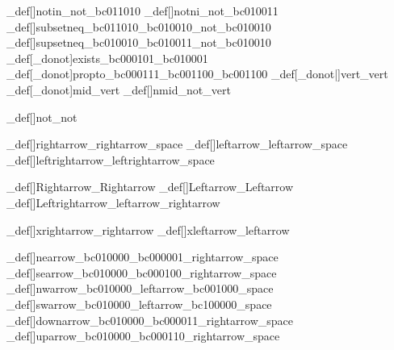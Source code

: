 \brl@char_def[\brl@char@not{}]{notin}{\brl@char@alias_not\brl@char_bc011010}
\brl@char_def[\brl@char@not{}]{notni}{\brl@char@alias_not\brl@char_bc010011}
\brl@char_def[]{subsetneq}{\brl@char_bc011010\brl@char_bc010010\brl@char@alias_not\brl@char_bc010010}
\brl@char_def[]{supsetneq}{\brl@char_bc010010\brl@char_bc010011\brl@char@alias_not\brl@char_bc010010}
\brl@char_def[\brl@char_donot]{exists}{\brl@char_bc000101\brl@char_bc010001}
\brl@char_def[\brl@char_donot]{propto}{\brl@char_bc000111\brl@char_bc001100\brl@char_bc001100}
\brl@char_def[\brl@char_donot|]{vert}{\brl@char@alias_vert}
\brl@char_def[\brl@char_donot]{mid}{\brl@char@alias_vert}
\brl@char_def[]{nmid}{\brl@char@alias_not\brl@char@alias_vert}






\brl@char_def[\gdef\brl@char_donot{\brl@char@donot}]{not}{\brl@char@alias_not}



\brl@char_def[]{rightarrow}{\brl@char@alias_rightarrow\brl@char@alias_space}
\brl@char_def[]{leftarrow}{\brl@char@alias_leftarrow\brl@char@alias_space}
\brl@char_def[]{leftrightarrow}{\brl@char@alias_leftrightarrow\brl@char@alias_space}

\brl@char_def[]{Rightarrow}{\brl@char@alias_Rightarrow}
\brl@char_def[]{Leftarrow}{\brl@char@alias_Leftarrow}
\brl@char_def[]{Leftrightarrow}{\brl@char@alias_leftarrow\brl@char@alias_rightarrow}


\brl@char_def[]{xrightarrow}{\brl@char@alias_rightarrow}
\brl@char_def[]{xleftarrow}{\brl@char@alias_leftarrow}



\brl@char_def[]{nearrow}{\brl@char_bc010000\brl@char_bc000001\brl@char@alias_rightarrow\brl@char@alias_space}
\brl@char_def[]{searrow}{\brl@char_bc010000\brl@char_bc000100\brl@char@alias_rightarrow\brl@char@alias_space}
\brl@char_def[]{nwarrow}{\brl@char_bc010000\brl@char@alias_leftarrow\brl@char_bc001000\brl@char@alias_space}
\brl@char_def[]{swarrow}{\brl@char_bc010000\brl@char@alias_leftarrow\brl@char_bc100000\brl@char@alias_space}
\brl@char_def[]{downarrow}{\brl@char_bc010000\brl@char_bc000011\brl@char@alias_rightarrow\brl@char@alias_space}
\brl@char_def[]{uparrow}{\brl@char_bc010000\brl@char_bc000110\brl@char@alias_rightarrow\brl@char@alias_space}

